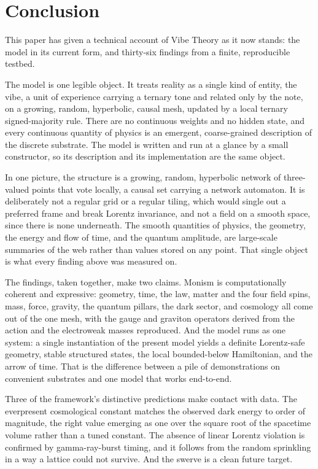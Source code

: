\section{Conclusion}
\label{sec:conclusion}

This paper has given a technical account of Vibe Theory as it now stands: the model in
its current form, and thirty-six findings from a finite, reproducible testbed.

The model is one legible object. It treats reality as a single kind of entity, the
vibe, a unit of experience carrying a ternary tone and related only by the note, on a
growing, random, hyperbolic, causal mesh, updated by a local ternary signed-majority
rule. There are no
continuous weights and no hidden state, and every continuous quantity of physics is an
emergent, coarse-grained description of the discrete substrate. The model is written and
run at a glance by a small constructor, so its description and its implementation are
the same object.

In one picture, the structure is a growing, random, hyperbolic network of three-valued
points that vote locally, a causal set carrying a network automaton. It is deliberately
not a regular grid or a regular tiling, which would single out a preferred frame and
break Lorentz invariance, and not a field on a smooth space, since there is none
underneath. The smooth quantities of physics, the geometry, the energy and flow of time,
and the quantum amplitude, are large-scale summaries of the web rather than values
stored on any point. That single object is what every finding above was measured on.

The findings, taken together, make two claims. Monism is computationally coherent and
expressive: geometry, time, the law, matter and the four field spins, mass, force,
gravity, the quantum pillars, the dark sector, and cosmology all come out of the one
mesh, with the gauge and graviton operators derived from the action and the electroweak
masses reproduced. And the model runs as one system: a single instantiation of the
present model yields a definite Lorentz-safe geometry, stable structured states, the
local bounded-below Hamiltonian, and the arrow of time. That is the difference between a
pile of demonstrations on convenient substrates and one model that works end-to-end.

Three of the framework's distinctive predictions make contact with data. The everpresent
cosmological constant matches the observed dark energy to order of magnitude, the right
value emerging as one over the square root of the spacetime volume rather than a tuned
constant. The absence of linear Lorentz violation is confirmed by gamma-ray-burst
timing, and it follows from the random sprinkling in a way a lattice could not survive.
And the swerve is a clean future target.

